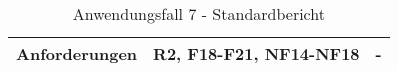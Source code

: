 \begin{table}[h]
\begin{adjustbox}{max width=\textwidth}
\begin{tabular}{lp{7.0cm}p{7.0cm}}
       

        Anforderungen                   &R2, F18-F21, NF14-NF18& -\\
        \bottomrule
    \end{tabular}
    \end{adjustbox}
    \caption{%
    Anwendungsfall 7 - Standardbericht   }
    \label{tab:AF_Standardbericht}
    \end{table}
\endgroup

